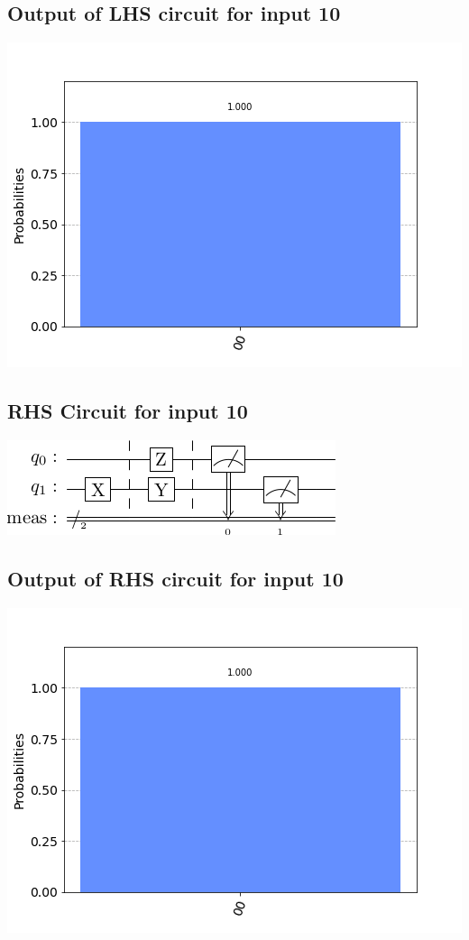 \documentclass[a4paper]{article}
\begin{document}
\begin{answer}[Qeusiton 1 b (c)]
        \subsection*{Output of LHS circuit for input 10}
        \includegraphics[scale = 0.5]{c110-out.png}
        \subsection*{RHS Circuit for input 10}
        \includegraphics[scale=0.5]{c210.png}
        \subsection*{Output of RHS circuit for input 10}
        \includegraphics[scale = 0.5]{c210-out.png}

\end{answer}
\end{document}
